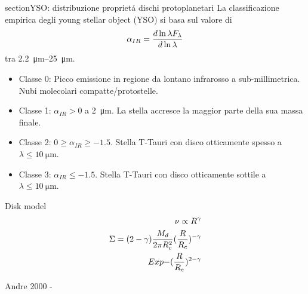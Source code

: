 \begin{workout}
	section{YSO: distribuzione propriet\'a dischi protoplanetari}
	La classificazione empirica degli young stellar object (YSO) si basa sul valore di
	\begin{equation}
	\alpha_{IR}=\frac{d \ln{\lambda F_{\lambda}}}{d \ln{\lambda}}
	\end{equation}
	tra \SIrange{2.2}{25}{\micro\meter}.
	\begin{itemize}
		\item Classe 0: Picco emissione in regione da lontano infrarosso a sub-millimetrica. Nubi molecolari compatte/protostelle.
		\item Classe 1: $\alpha_{IR}>0$ a \SI{2}{\micro\meter}. La stella accresce la maggior parte della sua massa finale.
		\item Classe 2: $0\geq\alpha_{IR}\geq-1.5$. Stella T-Tauri con disco otticamente spesso a $\lambda\leq\SI{10}{\micro\meter}$.
		\item Classe 3: $\alpha_{IR}\leq-1.5$. Stella T-Tauri con disco otticamente sottile a $\lambda\leq\SI{10}{\micro\meter}$.
	\end{itemize}
\end{workout}

\begin{workout}
	Disk model
	\begin{align}
		\nu\propto R^{\gamma}\\
		\Sigma=(2-\gamma)\frac{M_d}{2\pi R_c^2}(\frac{R}{R_c})^{-\gamma}\\Exp{-(\frac{R}{R_c})^{2-\gamma}}
	\end{align}
\end{workout}


\begin{workout}
	Andre 2000 - 
\end{workout}

